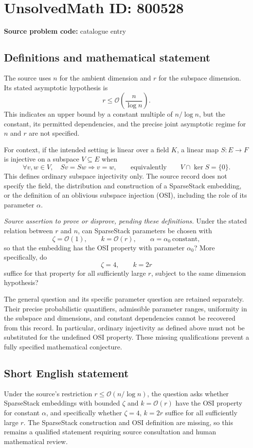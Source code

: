 \documentclass[11pt]{article}
\begin{document}
\section*{UnsolvedMath ID: 800528}
\textbf{Source problem code:} catalogue entry
\subsection{Definitions and mathematical statement}
The source uses \(n\) for the ambient dimension and \(r\) for the subspace dimension. Its stated asymptotic hypothesis is
\[
 r\leq \mathcal{O}\!\left(\frac{n}{\log n}\right).
\]
This indicates an upper bound by a constant multiple of \(n/\log n\), but the constant, its permitted dependencies, and the precise joint asymptotic regime for \(n\) and \(r\) are not specified.

For context, if the intended setting is linear over a field \(K\), a linear map \(S:E\to F\) is injective on a subspace \(V\subseteq E\) when
\[
 \forall v,w\in V,\quad Sv=Sw\Longrightarrow v=w,
 \qquad\text{equivalently}\qquad V\cap\ker S=\{0\}.
\]
This defines ordinary subspace injectivity only. The source record does not specify the field, the distribution and construction of a SparseStack embedding, or the definition of an oblivious subspace injection (OSI), including the role of its parameter \(\alpha\).

\emph{Source assertion to prove or disprove, pending these definitions.} Under the stated relation between \(r\) and \(n\), can SparseStack parameters be chosen with
\[
 \zeta=\mathcal{O}(1),\qquad k=\mathcal{O}(r),\qquad
 \alpha=\alpha_0\ \text{constant},
\]
so that the embedding has the OSI property with parameter \(\alpha_0\)? More specifically, do
\[
 \zeta=4,\qquad k=2r
\]
suffice for that property for all sufficiently large \(r\), subject to the same dimension hypothesis?

The general question and its specific parameter question are retained separately. Their precise probabilistic quantifiers, admissible parameter ranges, uniformity in the subspace and dimensions, and constant dependencies cannot be recovered from this record. In particular, ordinary injectivity as defined above must not be substituted for the undefined OSI property. These missing qualifications prevent a fully specified mathematical conjecture.
\subsection{Short English statement}
Under the source's restriction \(r\leq\mathcal{O}(n/\log n)\), the question asks whether SparseStack embeddings with bounded \(\zeta\) and \(k=\mathcal{O}(r)\) have the OSI property for constant \(\alpha\), and specifically whether \(\zeta=4\), \(k=2r\) suffice for all sufficiently large \(r\). The SparseStack construction and OSI definition are missing, so this remains a qualified statement requiring source consultation and human mathematical review.
\end{document}
